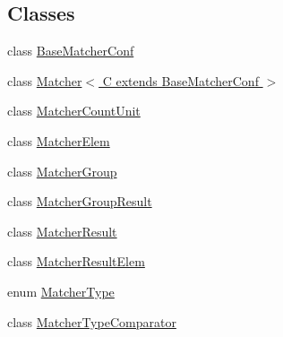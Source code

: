 \subsection*{\-Classes}
\begin{DoxyCompactItemize}
\item 
class \hyperlink{classlab_1_1davidahn_1_1appshuttle_1_1predict_1_1matcher_1_1_base_matcher_conf}{\-Base\-Matcher\-Conf}
\item 
class \hyperlink{classlab_1_1davidahn_1_1appshuttle_1_1predict_1_1matcher_1_1_matcher_3_01_c_01extends_01_base_matcher_conf_01_4}{\-Matcher$<$ C extends Base\-Matcher\-Conf $>$}
\item 
class \hyperlink{classlab_1_1davidahn_1_1appshuttle_1_1predict_1_1matcher_1_1_matcher_count_unit}{\-Matcher\-Count\-Unit}
\item 
class \hyperlink{classlab_1_1davidahn_1_1appshuttle_1_1predict_1_1matcher_1_1_matcher_elem}{\-Matcher\-Elem}
\item 
class \hyperlink{classlab_1_1davidahn_1_1appshuttle_1_1predict_1_1matcher_1_1_matcher_group}{\-Matcher\-Group}
\item 
class \hyperlink{classlab_1_1davidahn_1_1appshuttle_1_1predict_1_1matcher_1_1_matcher_group_result}{\-Matcher\-Group\-Result}
\item 
class \hyperlink{classlab_1_1davidahn_1_1appshuttle_1_1predict_1_1matcher_1_1_matcher_result}{\-Matcher\-Result}
\item 
class \hyperlink{classlab_1_1davidahn_1_1appshuttle_1_1predict_1_1matcher_1_1_matcher_result_elem}{\-Matcher\-Result\-Elem}
\item 
enum \hyperlink{enumlab_1_1davidahn_1_1appshuttle_1_1predict_1_1matcher_1_1_matcher_type}{\-Matcher\-Type}
\item 
class \hyperlink{classlab_1_1davidahn_1_1appshuttle_1_1predict_1_1matcher_1_1_matcher_type_comparator}{\-Matcher\-Type\-Comparator}
\end{DoxyCompactItemize}
